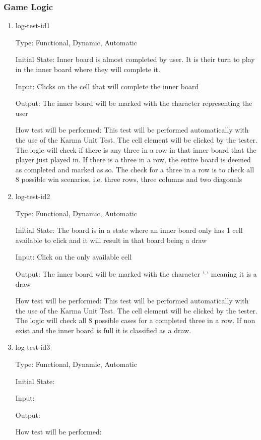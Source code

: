 \documentclass[12pt, titlepage]{article}
\begin{document}
\subsubsection{Game Logic}

\begin{enumerate}

\item{log-test-id1}

Type: Functional, Dynamic, Automatic
					
Initial State: Inner board is almost completed by user. It is their turn to play in the inner board where they will complete it. 
					
Input: Clicks on the cell that will complete the inner board
					
Output: The inner board will be marked with the character representing the user
					
How test will be performed: This test will be performed automatically with the use of the Karma Unit Test. The cell element will be clicked by the tester. The logic will check if there is any three in a row in that inner board that the player just played in. If there is a three in a row, the entire board is deemed as completed and marked as so. The check for a three in a row is to check all 8 possible win scenarios, i.e. three rows, three columns and two diagonals

\item{log-test-id2}

Type: Functional, Dynamic, Automatic
					
Initial State: The board is in a state where an inner board only has 1 cell available to click and it will result in that board being a draw

Input: Click on the only available cell
					
Output: The inner board will be marked with the character '-' meaning it is a draw
					
How test will be performed: This test will be performed automatically with the use of the Karma Unit Test. The cell element will be clicked by the tester. The logic will check all 8 possible cases for a completed three in a row. If non exist and the inner board is full it is classified as a draw.

\item{log-test-id3}

Type: Functional, Dynamic, Automatic
					
Initial State: 

Input: 
					
Output: 
					
How test will be performed: 

\end{enumerate}
\end{document}
